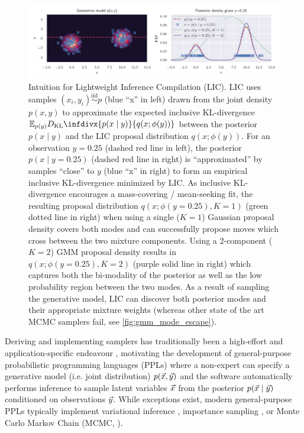 \documentclass[../../thesis.tex]{subfiles}
\begin{document}
\begin{figure}
  \centering
  \includegraphics[width=\linewidth]{Figures/intuition.pdf}
  \caption{
    Intuition for Lightweight Inference Compilation (LIC).
    LIC uses samples $(x_i, y_i) \overset{\text{iid}}{\sim} p$ (blue ``x'' in left)
    drawn from the joint density $p(x, y)$ to approximate the expected inclusive KL-divergence
    $\bE_{p(y)} D_{\text{KL}}\infdivx{p(x \mid y)}{q(x; \phi(y))}$
    between the posterior $p(x \mid y)$ and the LIC proposal distribution
    $q(x ; \phi(y))$. For an observation $y=0.25$ (dashed red line in left),
    the posterior $p(x \mid y=0.25)$ (dashed red line in right) is ``approximated''
    by samples ``close'' to $y$ (blue ``x'' in right) to form an empirical
    inclusive KL-divergence minimized by LIC. As inclusive KL-divergence
    encourages a mass-covering / mean-seeking fit, the resulting proposal
    distribution $q(x;\phi(y=0.25), K=1)$ (green dotted line in right)
    when using a single ($K=1$) Gaussian proposal density covers both modes
    and can successfully propose moves which cross between the two mixture
    components. Using a 2-component ($K=2$) GMM proposal density results in
    $q(x;\phi(y=0.25), K=2)$ (purple solid line in right) which captures both the
    bi-modality of the posterior as well as the low probability region between
    the two modes.
    As a result of sampling the generative model, LIC can discover
    both posterior modes and their appropriate mixture weights
    (whereas other state of the art MCMC samplers fail, see \cref{fig:gmm_mode_escape}).
  }\label{fig:intuition}
\end{figure}


Deriving and implementing samplers has traditionally been a high-effort and
application-specific endeavour \citep{porteous2008fast,murray2010elliptical},
motivating the development of general-purpose probabilistic programming
languages (PPLs) where a non-expert can specify a generative model (i.e.
joint distribution) $p(\vec{x}, \vec{y})$ and the software automatically performs
inference to sample latent variables $\vec{x}$ from the posterior $p(\vec{x} \mid
  \vec{y})$ conditioned on observations $\vec{y}$. While exceptions exist,
modern general-purpose PPLs typically implement variational inference
\citep{bingham2019pyro}, importance sampling
\citep{wood2014new,le2017inference}, or Monte Carlo Markov Chain (MCMC,
\cite{wingate2011lightweight,tehrani2020beanmachine}).
\end{document}
